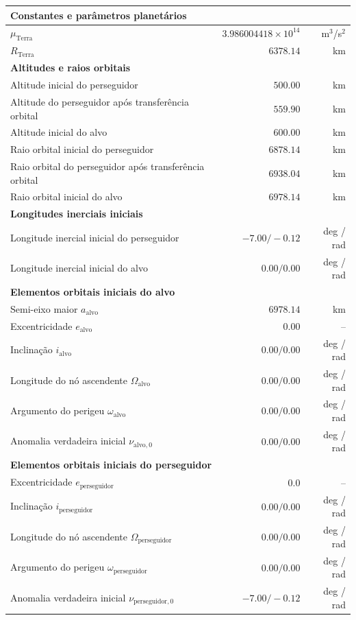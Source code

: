 \begin{longtable}{lrr}
\multicolumn{3}{l}{\textbf{Constantes e parâmetros planetários}} \\
\hline
$\mu_{\text{Terra}}$                               & $3.986004418\times 10^{14}$ & m$^{3}$/s$^{2}$ \\
$R_{\text{Terra}}$                                & $6378.14$                   & km \\
\hline
\multicolumn{3}{l}{\textbf{Altitudes e raios orbitais}} \\
\hline
Altitude inicial do perseguidor                   & $500.00$                    & km \\
Altitude do perseguidor após transferência orbital & $559.90$                   & km \\
Altitude inicial do alvo                          & $600.00$                    & km \\
Raio orbital inicial do perseguidor               & $6878.14$                   & km \\
Raio orbital do perseguidor após transferência orbital & $6938.04$              & km \\
Raio orbital inicial do alvo                      & $6978.14$                   & km \\
\hline
\multicolumn{3}{l}{\textbf{Longitudes inerciais iniciais}} \\
\hline
Longitude inercial inicial do perseguidor         & $-7.00 / -0.12$             & deg / rad \\
Longitude inercial inicial do alvo                & $0.00 / 0.00$               & deg / rad \\
\hline
\multicolumn{3}{l}{\textbf{Elementos orbitais iniciais do alvo}} \\
\hline
Semi-eixo maior $a_{\text{alvo}}$                 & $6978.14$                   & km \\
Excentricidade $e_{\text{alvo}}$                  & $0.00$                      & -- \\
Inclinação $i_{\text{alvo}}$                      & $0.00 / 0.00$               & deg / rad \\
Longitude do nó ascendente $\Omega_{\text{alvo}}$ & $0.00 / 0.00$               & deg / rad \\
Argumento do perigeu $\omega_{\text{alvo}}$       & $0.00 / 0.00$               & deg / rad \\
Anomalia verdadeira inicial $\nu_{\text{alvo},0}$ & $0.00 / 0.00$               & deg / rad \\
\hline
\multicolumn{3}{l}{\textbf{Elementos orbitais iniciais do perseguidor}} \\
\hline
Excentricidade $e_{\text{perseguidor}}$ & $0.0$ & -- \\
Inclinação $i_{\text{perseguidor}}$& $0.00 / 0.00$               & deg / rad \\
Longitude do nó ascendente $\Omega_{\text{perseguidor}}$ & $0.00 / 0.00$ & deg / rad \\
Argumento do perigeu $\omega_{\text{perseguidor}}$ & $0.00 / 0.00$& deg / rad \\
Anomalia verdadeira inicial $\nu_{\text{perseguidor},0}$ & $-7.00 / -0.12$& deg / rad \\

\end{longtable}
